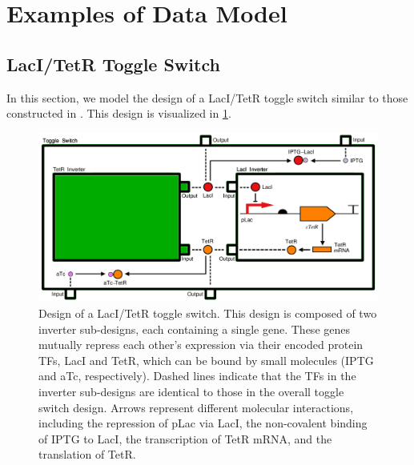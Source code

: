 \section{Examples of Data Model}
\label{sec:examples}

\subsection{LacI/TetR Toggle Switch}



In this section, we model the design of a LacI/TetR toggle switch similar to those constructed in \cite{Gardner2000}. This design is visualized in \ref{images:toggleswitch_modular}. 

\begin{figure}[ht]
\begin{center}
\includegraphics[scale=0.4]{images/toggleswitch_modular}
\caption[]{Design of a LacI/TetR toggle switch. This design is composed of two inverter sub-designs, each containing a single gene. These genes mutually repress each other's expression via their encoded protein TFs, LacI and TetR, which can be bound by small molecules (IPTG and aTc, respectively). Dashed lines indicate that the TFs in the inverter sub-designs are identical to those in the overall toggle switch design. Arrows represent different molecular interactions, including the repression of pLac via LacI, the non-covalent binding of IPTG to LacI, the transcription of TetR mRNA, and the translation of TetR.}
\label{images:toggleswitch_modular}
\end{center}
\end{figure}

